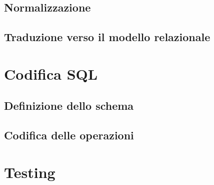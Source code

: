 \documentclass[11pt]{article}
\begin{document}
\subsection{Normalizzazione}
\subsection{Traduzione verso il modello relazionale}

\section{Codifica SQL}
\subsection{Definizione dello schema}
\subsection{Codifica delle operazioni}

\section{Testing}
\end{document}
